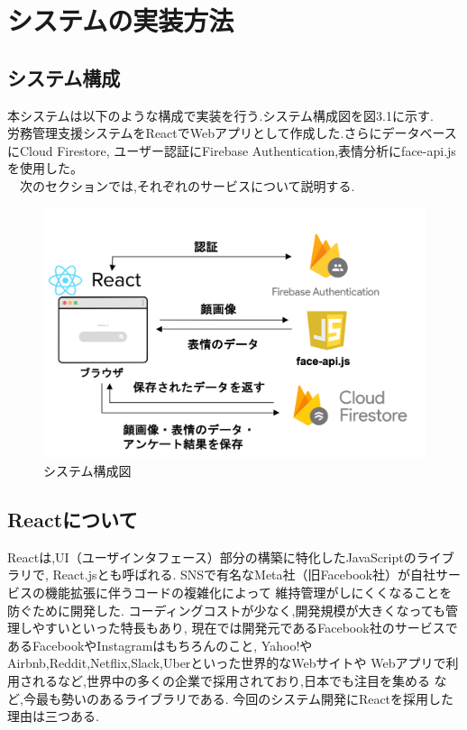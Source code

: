 \chapter{システムの実装方法}
\label{chp:reference}

\section{システム構成}
\label{sec:reference_ftnote}
本システムは以下のような構成で実装を行う.システム構成図を図3.1に示す.\\
労務管理支援システムをReactでWebアプリとして作成した.さらにデータベースにCloud Firestore,
ユーザー認証にFirebase Authentication,表情分析にface-api.jsを使用した。\\
　次のセクションでは,それぞれのサービスについて説明する.

\begin{figure}[!h]
	\begin{center}
			\includegraphics[scale=1.2, clip]{./img/compose.png}
			\caption{システム構成図}
			\label{fig:図の名前}
	\end{center}
\end{figure}


\section{Reactについて}
\label{sec:reference_quote}
Reactは,UI（ユーザインタフェース）部分の構築に特化したJavaScriptのライブラリで,
React.jsとも呼ばれる.
SNSで有名なMeta社（旧Facebook社）が自社サービスの機能拡張に伴うコードの複雑化によって
維持管理がしにくくなることを防ぐために開発した.
コーディングコストが少なく,開発規模が大きくなっても管理しやすいといった特長もあり,
現在では開発元であるFacebook社のサービスであるFacebookやInstagramはもちろんのこと,
Yahoo!やAirbnb,Reddit,Netflix,Slack,Uberといった世界的なWebサイトや
Webアプリで利用されるなど,世界中の多くの企業で採用されており,日本でも注目を集める
など,今最も勢いのあるライブラリである.
今回のシステム開発にReactを採用した理由は三つある.

